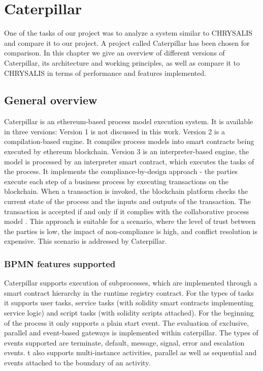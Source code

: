 %
\chapter{Caterpillar}
\label{sec:caterpillar}

One of the tasks of our project was to analyze a system similar to CHRYSALIS and compare it to our project. A project called Caterpillar has been chosen for comparison. In this chapter we give an overview of different versions of Caterpillar, its architecture and working principles, as well as compare it to CHRYSALIS in terms of performance and features implemented.

\section{General overview}
\label{sec:caterpillar:overview}

Caterpillar is an ethereum-based process model execution system. It is available in three versions: Version 1 is not discussed in this work. Version 2 is a compilation-based engine. It compiles process models into smart contracts being executed by ethereum blockchain. Version 3 is an interpreter-based engine, the model is processed by an interpreter smart contract, which executes the tasks of the process. It implements the compliance-by-design approach - the parties execute each step of a business process by executing transactions on the blockchain. When a transaction is invoked, the blockchain platform checks the current state of the process and the inputs and outputs of the transaction. The transaction is accepted if and only if it complies with the collaborative process model \cite{caterpillar}. This approach is suitable for a scenario, where the level of trust between the parties is low, the impact of non-compliance is high, and conflict resolution is expensive. This scenario is addressed by Caterpillar.

\subsection{BPMN features supported}
\label{sec:caterpillar:overview:bpmn}

Caterpillar supports execution of subprocesses, which are implemented through a smart contract hierarchy in the runtime registry contract. For the types of tasks it supports user tasks, service tasks (with solidity smart contracts implementing service logic) and script tasks (with solidity scripts attached). For the beginning of the process it only supports a plain start event. The evaluation of exclusive, parallel and event-based gateways is implemented within caterpillar. The types of events supported are terminate, default, message, signal, error and escalation events. t also supports multi-instance activities, parallel as well as sequential and events attached to the boundary of an activity.

